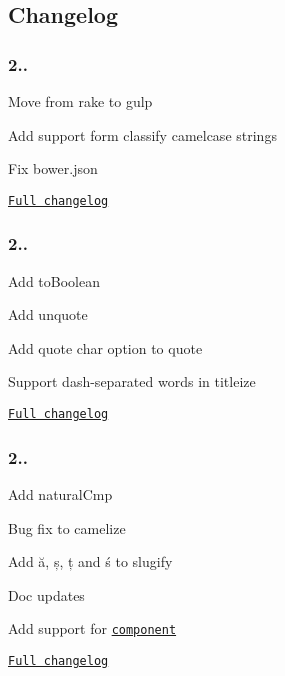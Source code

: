 \subsection*{Changelog}

\subsubsection*{2..}


\begin{DoxyItemize}
\item Move from rake to gulp
\item Add support form classify camelcase strings
\item Fix bower.\+json
\item \href{https://github.com/epeli/underscore.string/compare/v2.3.3...2.4.0}{\tt Full changelog}
\end{DoxyItemize}

\subsubsection*{2..}


\begin{DoxyItemize}
\item Add {\ttfamily to\+Boolean}
\item Add {\ttfamily unquote}
\item Add quote char option to {\ttfamily quote}
\item Support dash-\/separated words in {\ttfamily titleize}
\item \href{https://github.com/epeli/underscore.string/compare/v2.3.2...2.3.3}{\tt Full changelog}
\end{DoxyItemize}

\subsubsection*{2..}


\begin{DoxyItemize}
\item Add {\ttfamily natural\+Cmp}
\item Bug fix to {\ttfamily camelize}
\item Add ă, ș, ț and ś to {\ttfamily slugify}
\item Doc updates
\item Add support for \href{http://component.io/}{\tt component}
\item \href{https://github.com/epeli/underscore.string/compare/v2.3.1...v2.3.2}{\tt Full changelog}
\end{DoxyItemize}

